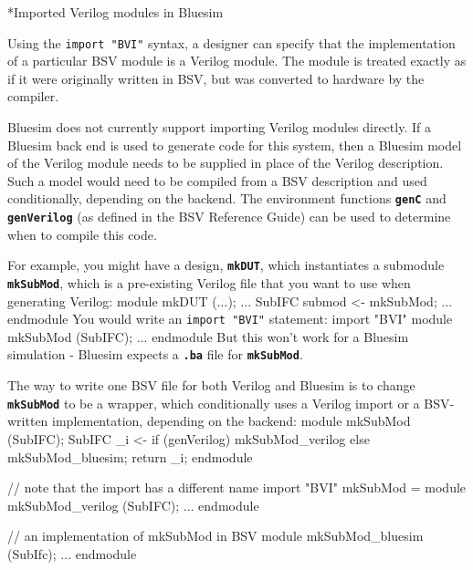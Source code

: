\documentclass{article}
\makeatletter
\newcommand{\te}[1]{\texttt{#1}}
\newenvironment{centerboxverbatim}
  {\center
   \boxedverbatim}
  {\endboxedverbatim
  {\endcenter }}
\def\subsubsubsection{\@startsection {subsubsubsection}{4}{\z@}{-3ex plus -1ex minus -.2ex}{1.25ex plus .2ex}{\normalsize\bf}*}
\makeatother
\begin{document}

\subsubsubsection{Imported Verilog modules in Bluesim}
\label{importV-bluesim}

Using the \te{import "BVI"} syntax, a designer can specify that the
implementation of a particular BSV module is a Verilog module.  The
module is treated exactly as if it were originally written in BSV, but
was converted to hardware by the compiler.

Bluesim does not currently support importing Verilog modules
directly.  If a Bluesim back end is used to generate code for this
system,  then a
Bluesim model of the Verilog module  needs to be supplied in place
of the Verilog description.  Such a model would need to be compiled from a
BSV description and used conditionally, depending on the backend.  The
 environment
functions {\bf\tt genC} and {\bf\tt genVerilog} (as defined in the BSV
Reference Guide) can be used to determine when to compile this code.

For example, you might have a design, {\bf\tt mkDUT}, which
instantiates a submodule {\bf\tt mkSubMod}, which is a pre-existing
Verilog  file that you want to use when generating Verilog:
\begin{centerboxverbatim}
module mkDUT (...);
   ...
   SubIFC submod <- mkSubMod;
   ...
endmodule
\end{centerboxverbatim}
You would write an \te{import "BVI"} statement:
\begin{centerboxverbatim}
  import "BVI" module mkSubMod (SubIFC); ... endmodule
\end{centerboxverbatim}
But this won't work for a Bluesim simulation - Bluesim
expects a {\bf\tt .ba} file for {\bf\tt mkSubMod}.

The way to write one BSV file for both Verilog and Bluesim is to
change {\bf\tt mkSubMod} to be a wrapper, which conditionally uses a
Verilog  import or a BSV-written implementation, depending on the backend:
\begin{centerboxverbatim}
module mkSubMod (SubIFC);
   SubIFC _i <- if (genVerilog)
                   mkSubMod_verilog
                else
                   mkSubMod_bluesim;
   return _i;
endmodule

// note that the import has a different name
import "BVI" mkSubMod =
    module mkSubMod_verilog (SubIFC); ... endmodule

// an implementation of mkSubMod in BSV
module mkSubMod_bluesim (SubIfc);
   ...
endmodule
\end{centerboxverbatim}
\end{document}

